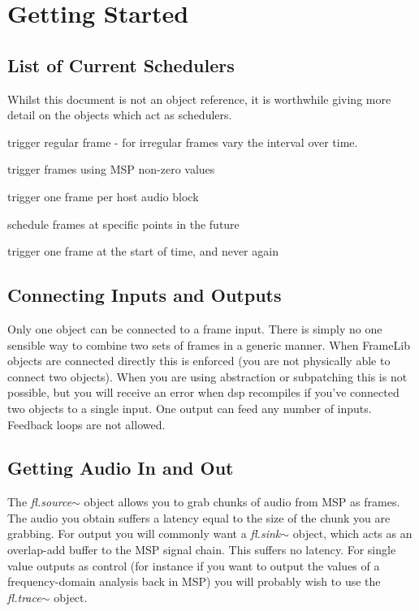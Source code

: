 \documentclass{article}
\newcommand{\flobject}[1]{\textit{fl.#1$\sim$}}
\begin{document}
\section{Getting Started}
\vspace{0.1in}

\subsection{List of Current Schedulers}

Whilst this document is not an object reference, it is worthwhile giving more detail on the objects which act as schedulers.

\begin{description}[align=left, itemindent=3cm, labelwidth=3cm]
\item [\flobject{interval}] trigger regular frame - for irregular frames vary the interval over time.
\item [\flobject{audiotrigger}] trigger frames using MSP non-zero values
\item [\flobject{perblock}] trigger one frame per host audio block
\item [\flobject{future}] schedule frames at specific points in the future
\item [\flobject{once}] trigger one frame at the start of time, and never again
\end{description}

\subsection{Connecting Inputs and Outputs}

Only one object can be connected to a frame input. There is simply no one sensible way to combine two sets of frames in a generic manner.  When FrameLib objects are connected directly this is enforced (you are not physically able to connect two objects). When you are using abstraction or subpatching this is not possible, but you will receive an error when dsp recompiles if you've connected two objects to a single input. One output can feed any number of inputs. Feedback loops are not allowed.

\subsection{Getting Audio In and Out}

The \flobject{source} object allows you to grab chunks of audio from MSP as frames. The audio you obtain suffers a latency equal to the size of the chunk you are grabbing. For output you will commonly want a \flobject{sink} object, which acts as an overlap-add buffer to the MSP signal chain. This suffers no latency. For single value outputs as control (for instance if you want to output the values of a frequency-domain analysis back in MSP) you will probably wish to use the \flobject{trace} object.
\end{document}
